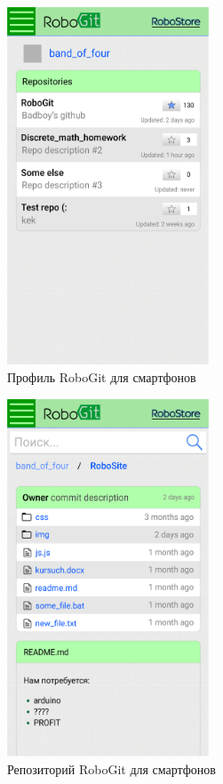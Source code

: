 \documentclass[12pt, a4paper]{article}
\begin{document}
\begin{figure}[H]
  \centering
  \includegraphics[width=6cm]{png/git_profile_smart.png}
  \caption{Профиль RoboGit для смартфонов}
\end{figure}

\begin{figure}[H]
  \centering
  \includegraphics[width=6cm]{png/git_repo_smart.png}
  \caption{Репозиторий RoboGit для смартфонов}
\end{figure}
\end{document}
